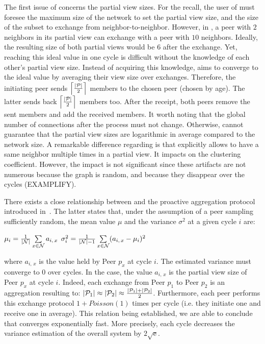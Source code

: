 The first issue of \CYCLON{} concerns the partial view sizes. For the recall,
the user of \CYCLON{} must foresee the maximum size of the network to set the
partial view size, and the size of the subset to exchange from
neighbor-to-neighbor.  However, in \SCAMPLON{}, a peer with $2$ neighbors in
its partial view can exchange with a peer with $10$ neighbors. Ideally, the
resulting size of both partial views would be $6$ after the exchange. Yet,
reaching this ideal value in one cycle is difficult without the knowledge of
each other's partial view size. Instead of acquiring this knowledge,
\SCAMPLON{} aims to converge to the ideal value by averaging their view size
over exchanges. Therefore, the initiating peer sends
$\left\lceil|\mathcal{P}|\over{2}\right\rceil$ members to the chosen peer
(chosen by age). The latter sends back
$\left\lceil|\mathcal{P}|\over{2}\right\rceil$ members too. After the receipt,
both peers remove the sent members and add the received members. It worth
noting that the global number of connections after the process must not
change. Otherwise, \SCAMPLON{} cannot guarantee that the partial view sizes are
logarithmic in average compared to the network size.  A remarkable difference
regarding \CYCLON{} is that \SCAMPLON{} explicitly allows to have a same
neighbor multiple times in a partial view. It impacts on the clustering
coefficient. However, the impact is not significant since these artifacts are
not numerous because the graph is random, and because they disappear over the
\SCAMPLON{} cycles (EXAMPLIFY).

There exists a close relationship between \SCAMPLON{} and the proactive
aggregation protocol introduced
in~\cite{jelasity2004epidemic,montresor2004robust}. The latter states that,
under the assumption of a peer sampling sufficiently random, the mean value
$\mu$ and the variance $\sigma^2$ at a given cycle $i$ are:
\begin{center}
  $\mu_i = {1\over{|\mathcal{N}|}} \sum\limits_{x \in \mathcal{N}} a_{i,\,x}$
  \hfill
  $\sigma^2_i = {1\over{|\mathcal{N}|-1}}\sum\limits_{x \in \mathcal{N}}
  (a_{i,\,x} - \mu_i)^2$
\end{center}
where $a_{i,\,x}$ is the value held by Peer $p_x$ at cycle $i$. The estimated
variance must converge to $0$ over cycles. In the \SCAMPLON{} case, the value
$a_{i,\,x}$ is the partial view size of Peer $p_x$ at cycle $i$. Indeed, each
exchange from Peer $p_1$ to Peer $p_2$ is an aggregation resulting to:
$|\mathcal{P}_1|\approx|\mathcal{P}_2|\approx{|\mathcal{P}_1| + |\mathcal{P}_2|
  \over{2}}$.
Furthermore, each peer performs this exchange protocol $1+Poisson(1)$ times per
cycle (i.e. they initiate one and receive one in average).  This relation being
established, we are able to conclude that \SCAMPLON{} converges exponentially
fast. More precisely, each cycle decreases the variance estimation of the
overall system by ${2\sqrt{\text{e}}}$.


